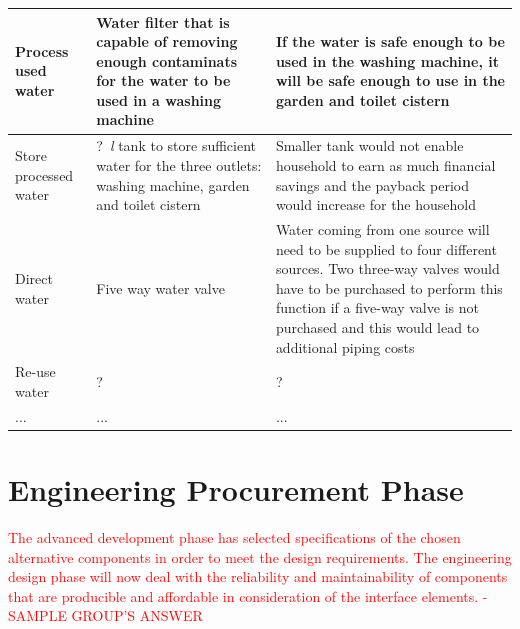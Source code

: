 \documentclass[a4paper,11pt,fleqn]{report}
\begin{document}
{\begin{table}[h!]
\begin{center}
\begin{tabular}{p{4.5cm}|p{4.5cm}|p{4.5cm}}
        \hline
    Process used water & Water filter that is capable of removing enough contaminats for the water to be used in a washing machine & If the water is safe enough to be used in the washing machine, it will be safe enough to use in the garden and toilet cistern\\
        \hline
    Store processed water & ?~\textit{l} tank to store sufficient water for the three outlets: washing machine, garden and toilet cistern & Smaller tank would not enable household to earn as much financial savings and the payback period would increase for the household\\
        \hline
    Direct water & Five way water valve & Water coming from one source will need to be supplied to four different sources. Two three-way valves would have to be purchased to perform this function if a five-way valve is not purchased and this would lead to additional piping costs\\
            \hline
    Re-use water & ? & ?\\
            \hline
    ... & ... & ...\\

    \bottomrule
\end{tabular}
\end{center}
\end{table}
%
\section{Engineering Procurement Phase}
\textcolor{red}{The advanced development phase has selected specifications of the chosen alternative components in order to meet the design requirements. The engineering design phase will now deal with the reliability and maintainability of components that are producible and affordable in consideration of the interface elements. - SAMPLE GROUP'S ANSWER}

}
\end{document}
